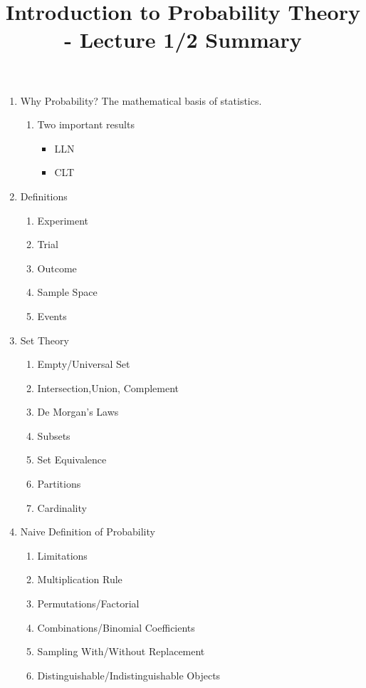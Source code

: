 \documentclass[12pt]{article} %
\title{Introduction to Probability Theory - Lecture 1/2 Summary}
\begin{document}
\maketitle
\begin{enumerate}
\item Why Probability? The mathematical basis of statistics.
\begin{enumerate}
\item Two important results
\begin{itemize}
\item LLN
\item CLT
\end{itemize}
\end{enumerate}
\item Definitions
\begin{enumerate}
\item Experiment
\item Trial
\item Outcome
\item Sample Space
\item Events
\end{enumerate}
\item Set Theory
\begin{enumerate}
\item Empty/Universal Set
\item Intersection,Union, Complement
\item De Morgan's Laws
\item Subsets
\item Set Equivalence
\item Partitions
\item Cardinality
\end{enumerate}
\item Naive Definition of Probability
\begin{enumerate}
\item Limitations
\item Multiplication Rule
\item Permutations/Factorial
\item Combinations/Binomial Coefficients
\item Sampling With/Without Replacement
\item Distinguishable/Indistinguishable Objects
\end{enumerate}
\end{enumerate}
\end{document}

